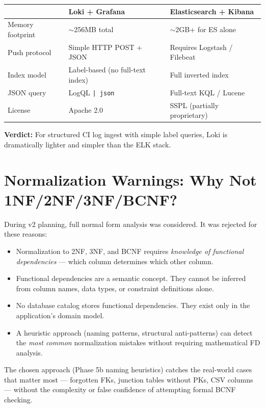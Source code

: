 \documentclass[12pt,a4paper]{report}
\begin{document}
\begin{center}
\begin{tabular}{@{}p{5cm}p{4.5cm}p{4.5cm}@{}}
\toprule
& \textbf{Loki + Grafana} & \textbf{Elasticsearch + Kibana} \\
\midrule
Memory footprint & $\sim$256MB total & $\sim$2GB+ for ES alone \\
Push protocol   & Simple HTTP POST + JSON & Requires Logstash / Filebeat \\
Index model     & Label-based (no full-text index) & Full inverted index \\
JSON query      & LogQL \texttt{| json} & Full-text KQL / Lucene \\
License         & Apache 2.0 & SSPL (partially proprietary) \\
\bottomrule
\end{tabular}
\end{center}

\textbf{Verdict:} For structured CI log ingest with simple label queries,
Loki is dramatically lighter and simpler than the ELK stack.

\section{Normalization Warnings: Why Not 1NF/2NF/3NF/BCNF?}

During v2 planning, full normal form analysis was considered. It was rejected for
these reasons:

\begin{itemize}
  \item Normalization to 2NF, 3NF, and BCNF requires \emph{knowledge of functional
        dependencies} — which column determines which other column.
  \item Functional dependencies are a semantic concept. They cannot be inferred
        from column names, data types, or constraint definitions alone.
  \item No database catalog stores functional dependencies. They exist only in the
        application's domain model.
  \item A heuristic approach (naming patterns, structural anti-patterns) can detect
        the \emph{most common} normalization mistakes without requiring mathematical
        FD analysis.
\end{itemize}

The chosen approach (Phase 5b naming heuristics) catches the real-world cases that
matter most — forgotten FKs, junction tables without PKs, CSV columns — without
the complexity or false confidence of attempting formal BCNF checking.
\end{document}
